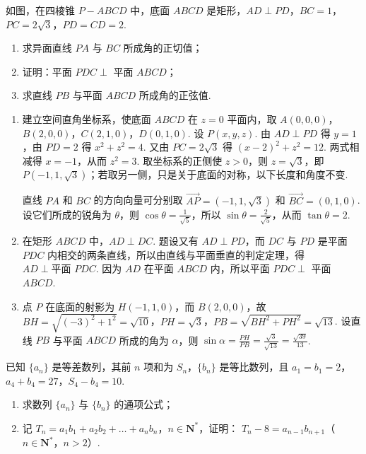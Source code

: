 \begin{problem}
如图，在四棱锥 \(P - ABCD\) 中，底面 \(ABCD\) 是矩形，\(AD \perp PD\)，\(BC = 1\)，\(PC = 2\sqrt{3}\)，\(PD = CD = 2\).
\begin{enumerate}
\item 求异面直线 \(PA\) 与 \(BC\) 所成角的正切值；
\item 证明：平面 \(PDC \perp\) 平面 \(ABCD\)；
\item 求直线 \(PB\) 与平面 \(ABCD\) 所成角的正弦值.
\end{enumerate}
\end{problem}

\begin{solution}
\begin{enumerate}
    \item 建立空间直角坐标系，使底面 \(ABCD\) 在 \(z=0\) 平面内，取 \(A(0,0,0)\)，\(B(2,0,0)\)，\(C(2,1,0)\)，\(D(0,1,0)\). 设 \(P(x,y,z)\). 由 \(AD\perp PD\) 得 \(y=1\)，由 \(PD=2\) 得 \(x^2+z^2=4\). 又由 \(PC=2\sqrt3\) 得 \((x-2)^2+z^2=12\). 两式相减得 \(x=-1\)，从而 \(z^2=3\). 取坐标系的正侧使 \(z>0\)，则 \(z=\sqrt3\)，即 \(P(-1,1,\sqrt3)\)；若取另一侧，只是关于底面的对称，以下长度和角度不变.

直线 \(PA\) 和 \(BC\) 的方向向量可分别取 \(\overrightarrow{AP}=(-1,1,\sqrt3)\) 和 \(\overrightarrow{BC}=(0,1,0)\). 设它们所成的锐角为 \(\theta\)，则 \(\cos\theta=\frac{1}{\sqrt5}\)，所以 \(\sin\theta=\frac{2}{\sqrt5}\)，从而 \(\tan\theta=2\).

\item 在矩形 \(ABCD\) 中，\(AD\perp DC\). 题设又有 \(AD\perp PD\)，而 \(DC\) 与 \(PD\) 是平面 \(PDC\) 内相交的两条直线，所以由直线与平面垂直的判定定理，得 \(AD\perp\text{平面 }PDC\). 因为 \(AD\) 在平面 \(ABCD\) 内，所以平面 \(PDC\perp\) 平面 \(ABCD\).

\item 点 \(P\) 在底面的射影为 \(H(-1,1,0)\)，而 \(B(2,0,0)\)，故 \(BH=\sqrt{(-3)^2+1^2}=\sqrt{10}\)，\(PH=\sqrt3\)，\(PB=\sqrt{BH^2+PH^2}=\sqrt{13}\). 设直线 \(PB\) 与平面 \(ABCD\) 所成的角为 \(\alpha\)，则 \(\sin\alpha=\frac{PH}{PB}=\frac{\sqrt3}{\sqrt{13}}=\frac{\sqrt{39}}{13}\).
\end{enumerate}
\end{solution}

\begin{problem}
已知 \(\{a_{n}\}\) 是等差数列，其前 \(n\) 项和为 \(S_{n}\)，\(\{b_{n}\}\) 是等比数列，且 \(a_{1} = b_{1} = 2\)，\(a_{4} + b_{4} = 27\)，\(S_{4} - b_{4} = 10\).
\begin{enumerate}
\item 求数列 \( \{a_{n}\} \) 与 \( \{b_{n}\} \) 的通项公式；
\item 记 \(T_{n} = a_{1}b_{1} + a_{2}b_{2} + \dots + a_{n}b_{n}\)，\(n \in \mathbf{N}^{*}\)，证明： \(T_{n} - 8 = a_{n-1}b_{n+1}\)（\(n \in \mathbf{N}^{*}\)，\(n > 2\)）.
\end{enumerate}
\end{problem}


